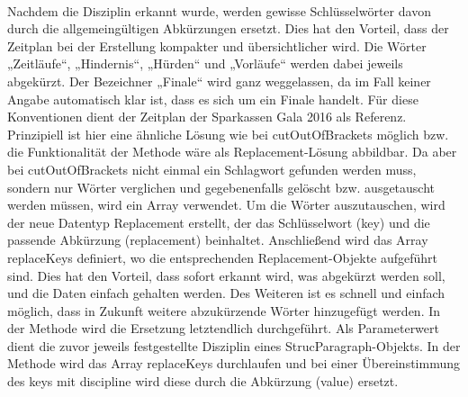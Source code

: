 \\
Nachdem die Disziplin erkannt wurde, werden gewisse Schlüsselwörter davon durch die allgemeingültigen Abkürzungen ersetzt. Dies hat den Vorteil, dass der Zeitplan bei der Erstellung kompakter und übersichtlicher wird. Die Wörter „Zeitläufe“, „Hindernis“, „Hürden“ und „Vorläufe“ werden dabei jeweils abgekürzt. Der Bezeichner „Finale“ wird ganz weggelassen, da im Fall keiner Angabe automatisch klar ist, dass es sich um ein Finale handelt. Für diese Konventionen dient der Zeitplan der Sparkassen Gala 2016 als Referenz. Prinzipiell ist hier eine ähnliche Lösung wie bei cutOutOfBrackets möglich bzw. die Funktionalität der Methode wäre als Replacement-Lösung abbildbar. Da aber bei cutOutOfBrackets nicht einmal ein Schlagwort gefunden werden muss, sondern nur Wörter verglichen und gegebenenfalls gelöscht bzw. ausgetauscht werden müssen, wird ein Array verwendet. Um die Wörter auszutauschen, wird der neue Datentyp Replacement erstellt, der das Schlüsselwort (key) und die passende Abkürzung (replacement) beinhaltet. Anschließend wird das Array replaceKeys definiert, wo die entsprechenden Replacement-Objekte aufgeführt sind. Dies hat den Vorteil, dass sofort erkannt wird, was abgekürzt werden soll, und die Daten einfach gehalten werden. Des Weiteren ist es schnell und einfach möglich, dass in Zukunft weitere abzukürzende Wörter hinzugefügt werden. In der Methode wird die Ersetzung letztendlich durchgeführt. Als Parameterwert dient die zuvor jeweils festgestellte Disziplin eines StrucParagraph-Objekts. In der Methode wird das Array replaceKeys durchlaufen und bei einer Übereinstimmung des keys mit discipline wird diese durch die Abkürzung (value) ersetzt.

